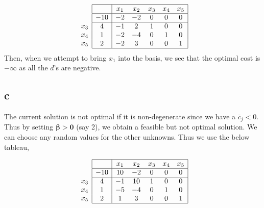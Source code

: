 $$
\begin{array}{c}
\\
 \\
x_3 \\
x_4 \\ 
x_5 \\
\end{array}
\begin{array}{|c|ccccc|}
    \hline
    & x_1 & x_2 & x_3 & x_4 & x_5\\ \hline
  -10 & -2 & -2 & 0 & 0 & 0\\ \hline
  4 & -1 & 2 & 1 & 0 & 0\\
  1 & -2 & -4 & 0 & 1 & 0\\
  2 & -2 & 3 & 0 & 0 & 1\\\hline
\end{array}
$$
Then, when we attempt to bring $x_1$ into the basis, we see that the optimal cost is $- \infty$ as all the $d$'s are negative.

\subsection*{c}
The current solution is not optimal if it is non-degenerate since we have a $\bar{c}_j < 0$. Thus by setting $\boldsymbol{\beta > 0}$ (say 2), we obtain a feasible but not optimal solution. We can choose any random values for the other unknowns. Thus we use the below tableau,


$$
\begin{array}{c}
\\
 \\
x_3 \\
x_4 \\ 
x_5 \\
\end{array}
\begin{array}{|c|ccccc|}
    \hline
    & x_1 & x_2 & x_3 & x_4 & x_5\\ \hline
  -10 & 10 & -2 & 0 & 0 & 0\\ \hline
  4 & -1 & 10 & 1 & 0 & 0\\
  1 & -5 & -4 & 0 & 1 & 0\\
  2 & 1 & 3 & 0 & 0 & 1\\\hline
\end{array}
$$
